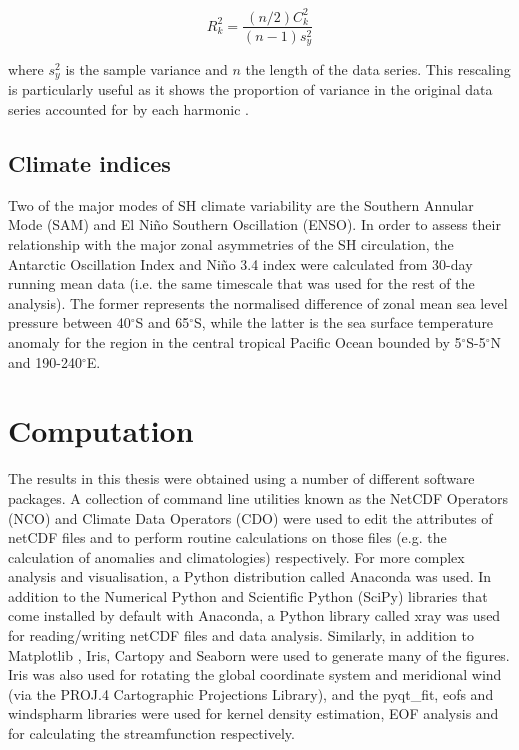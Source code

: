 \begin{equation}\label{eq:variance_explained}
R_k^2 = \frac{(n/2)C_k^2}{(n-1)s_y^2}
\end{equation}

\noindent where $s_y^2$ is the sample variance and $n$ the length of the data series. This rescaling is particularly useful as it shows the proportion of variance in the original data series accounted for by each harmonic \citep{Wilks2011}.

\subsection{Climate indices}
Two of the major modes of SH climate variability are the Southern Annular Mode (SAM) and El Ni\~{n}o Southern Oscillation (ENSO). In order to assess their relationship with the major zonal asymmetries of the SH circulation, the Antarctic Oscillation Index \citep[AOI;][]{Gong1999} and Ni\~{n}o 3.4 index \citep{Trenberth2001} were calculated from 30-day running mean data (i.e. the same timescale that was used for the rest of the analysis). The former represents the normalised difference of zonal mean sea level pressure between 40$^{\circ}$S and 65$^{\circ}$S, while the latter is the sea surface temperature anomaly for the region in the central tropical Pacific Ocean bounded by 5$^{\circ}$S-5$^{\circ}$N and 190-240$^{\circ}$E. 


\section{Computation}\label{s:computation}


The results in this thesis were obtained using a number of different software packages. A collection of command line utilities known as the NetCDF Operators (NCO) and Climate Data Operators (CDO) were used to edit the attributes of netCDF files and to perform routine calculations on those files (e.g. the calculation of anomalies and climatologies) respectively. For more complex analysis and visualisation, a Python distribution called Anaconda was used. In addition to the Numerical Python \citep[NumPy;][]{VanDerWalt2011} and Scientific Python (SciPy) libraries that come installed by default with Anaconda, a Python library called xray was used for reading/writing netCDF files and data analysis. Similarly, in addition to Matplotlib \citep[the default Python plotting library;][]{Hunter2007}, Iris, Cartopy and Seaborn were used to generate many of the figures. Iris was also used for rotating the global coordinate system and meridional wind (via the PROJ.4 Cartographic Projections Library), and the pyqt\_fit, eofs and windspharm libraries were used for kernel density estimation, EOF analysis and for calculating the streamfunction respectively.

